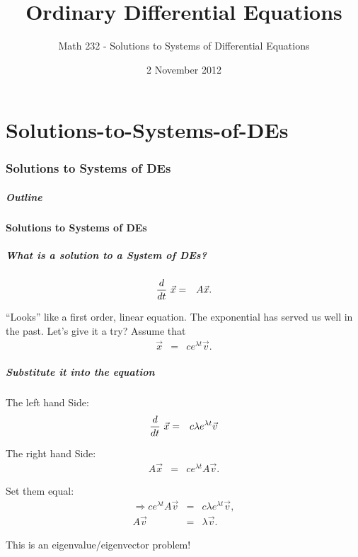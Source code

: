 \part{Solutions-to-Systems-of-DEs}
\section{Solutions to Systems of DEs}


\title{Ordinary Differential Equations}
\subtitle{Math 232 - Solutions to Systems of Differential Equations}
\date{2 November 2012}

\begin{frame}
  \titlepage
\end{frame}

\begin{frame}
  \frametitle{Outline}
\end{frame}


\subsection{Solutions to Systems of DEs}


\begin{frame}
  \frametitle{What is a solution to a System of DEs?}

  \begin{eqnarray*}
    \deriv{~}{t} \vec{x} & = & A \vec{x}.
  \end{eqnarray*}

  {
    ``Looks'' like a first order, linear equation. The exponential has
    served us well in the past. Let's give it a try? Assume that 
    \begin{eqnarray*}
      \vec{x} & = & c e^{\lambda t} \vec{v}.
    \end{eqnarray*}
  }


\end{frame}


\begin{frame}
  \frametitle{Substitute it into the equation}

  The left hand Side:
  \begin{eqnarray*}
    \deriv{~}{t} \vec{x} & = & c \lambda e^{\lambda t} \vec{v} \\
  \end{eqnarray*}

  {
    The right hand Side:
    \begin{eqnarray*}
      A \vec{x} & = & c e^{\lambda t} A \vec{v}.
    \end{eqnarray*}
  }

  {
    Set them equal:
    \begin{eqnarray*}
      \Rightarrow c  e^{\lambda t} A \vec{v} & = & c \lambda e^{\lambda t} \vec{v}, \\
      A \vec{v} & = & \lambda \vec{v}.
    \end{eqnarray*}
  }

  {
    This is an eigenvalue/eigenvector problem!
  }

\end{frame}


